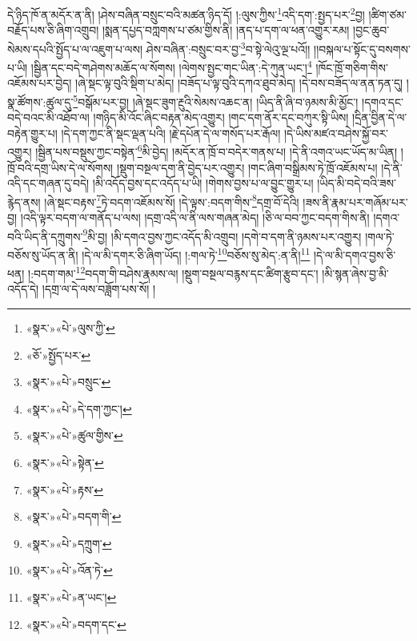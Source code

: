 དེ་ཉིད་ཁོ་ན་མདོར་ན་ནི། །ཤེས་བཞིན་བསྲུང་བའི་མཚན་ཉིད་དོ། །:ལུས་ཀྱིས་\footnote{«སྣར་»«པེ་»ལུས་ཀྱི་}འདི་དག་:སྤྱད་པར་\footnote{«ཅོ་»སྤྱོད་པར་}བྱ། །ཚིག་ཙམ་བརྗོད་པས་ཅི་ཞིག་འགྲུབ། །སྨན་དཔྱད་བཀླགས་པ་ཙམ་གྱིས་ནི། །ནད་པ་དག་ལ་ཕན་འགྱུར་རམ། །བྱང་ཆུབ་སེམས་དཔའི་སྤྱོད་པ་ལ་འཇུག་པ་ལས། ཤེས་བཞིན་:བསྲུང་བར་བྱ་\footnote{«སྣར་»«པེ་»བསྲུང་}བ་སྟེ་ལེའུ་ལྔ་པའོ།། །།བསྐལ་པ་སྟོང་དུ་བསགས་པ་ཡི། །སྦྱིན་དང་བདེ་གཤེགས་མཆོད་ལ་སོགས། །ལེགས་སྤྱང་གང་ཡིན་:དེ་ཀུན་ཡང་།\footnote{«སྣར་»«པེ་»དེ་དག་ཀྱང་།} །ཁོང་ཁྲོ་གཅིག་གིས་འཇོམས་པར་བྱེད། །ཞེ་སྡང་ལྟ་བུའི་སྡིག་པ་མེད། །བཟོད་པ་ལྟ་བུའི་དཀའ་ཐུབ་མེད། །དེ་བས་བཟོད་ལ་ནན་ཏན་དུ། །སྣ་ཚོགས་:ཚུལ་དུ་\footnote{«སྣར་»«པེ་»ཚུལ་གྱིས་}བསྒོམ་པར་བྱ། །ཞེ་སྡང་ཟུག་རྔུའི་སེམས་འཆང་ན། །ཡིད་ནི་ཞི་བ་ཉམས་མི་མྱོང་། །དགའ་དང་བདེ་བའང་མི་འཐོབ་ལ། །གཉིད་མི་འོང་ཞིང་བརྟན་མེད་འགྱུར། །གང་དག་ནོར་དང་བཀུར་སྟི་ཡིས། །དྲིན་བྱིན་དེ་ལ་བརྟེན་གྱུར་པ། །དེ་དག་ཀྱང་ནི་སྡང་ལྡན་པའི། །རྗེ་དཔོན་དེ་ལ་གསོད་པར་རྒོལ། །དེ་ཡིས་མཛའ་བཤེས་སྐྱོ་བར་འགྱུར། །སྦྱིན་པས་བསྡུས་ཀྱང་བསྟེན་\footnote{«སྣར་»«པེ་»སྟེན་}མི་བྱེད། །མདོར་ན་ཁྲོ་བ་བདེར་གནས་པ། །དེ་ནི་འགའ་ཡང་ཡོད་མ་ཡིན། །ཁྲོ་བའི་དགྲ་ཡིས་དེ་ལ་སོགས། །སྡུག་བསྔལ་དག་ནི་བྱེད་པར་འགྱུར། །གང་ཞིག་བསྒྲིམས་ཏེ་ཁྲོ་འཇོམས་པ། །དེ་ནི་འདི་དང་གཞན་དུ་བདེ། །མི་འདོད་བྱས་དང་འདོད་པ་ཡི། །གེགས་བྱས་པ་ལ་བྱུང་གྱུར་པ། །ཡིད་མི་བདེ་བའི་ཟས་རྙེད་ནས། །ཞེ་སྡང་བརྟས་\footnote{«སྣར་»«པེ་»རྟས་}ཏེ་བདག་འཇོམས་སོ། །དེ་ལྟས་:བདག་གིས་\footnote{«སྣར་»«པེ་»བདག་གི་}དགྲ་བོ་དེའི། །ཟས་ནི་རྣམ་པར་གཞོམ་པར་བྱ། །འདི་ལྟར་བདག་ལ་གནོད་པ་ལས། །དགྲ་འདི་ལ་ནི་ལས་གཞན་མེད། །ཅི་ལ་བབ་ཀྱང་བདག་གིས་ནི། །དགའ་བའི་ཡིད་ནི་དཀྲུགས་\footnote{«སྣར་»«པེ་»དཀྲུག་}མི་བྱ། །མི་དགའ་བྱས་ཀྱང་འདོད་མི་འགྲུབ། །དགེ་བ་དག་ནི་ཉམས་པར་འགྱུར། །གལ་ཏེ་བཅོས་སུ་ཡོད་ན་ནི། །དེ་ལ་མི་དགར་ཅི་ཞིག་ཡོད། །:གལ་ཏེ་\footnote{«སྣར་»«པེ་»འོན་ཏེ་}བཅོས་སུ་མེད་:ན་ནི།\footnote{«སྣར་»«པེ་»ན་ཡང་།} །དེ་ལ་མི་དགའ་བྱས་ཅི་ཕན། །:བདག་གམ་\footnote{«སྣར་»«པེ་»བདག་དང་}བདག་གི་བཤེས་རྣམས་ལ། །སྡུག་བསྔལ་བརྙས་དང་ཚིག་རྩུབ་དང་། །མི་སྙན་ཞེས་བྱ་མི་འདོད་དེ། །དགྲ་ལ་དེ་ལས་བཟློག་པས་སོ། །
